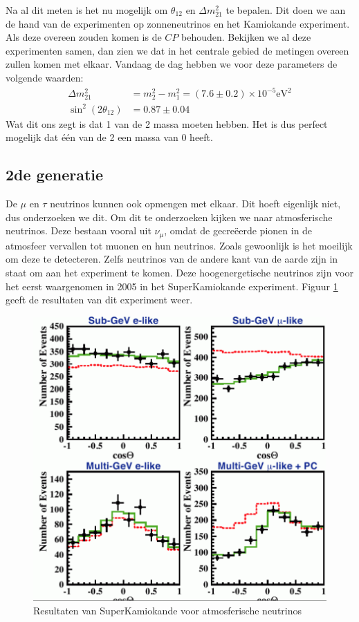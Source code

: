\documentclass[../main.tex]{subfiles}
\begin{document}
Na al dit meten is het nu mogelijk om $\theta_{12}$ en $\Delta m_{21}^{2}$ te bepalen. Dit doen we aan de hand van de experimenten op zonneneutrinos en het Kamiokande experiment. Als deze overeen zouden komen is de $CP$ behouden. Bekijken we al deze experimenten samen, dan zien we dat in het centrale gebied de metingen overeen zullen komen met elkaar. Vandaag de dag hebben we voor deze parameters de volgende waarden:
\begin{equation}
    \begin{aligned}
        \label{eq:neutrino_osc_waarden}
        \Delta m_{21}^{2}&=m_{2}^{2}-m_{1}^{2}=(7.6 \pm 0.2) \times 10^{-5} \mathrm{eV}^{2}\\
        \sin ^{2}\left(2 \theta_{12}\right)&=0.87 \pm 0.04
    \end{aligned}
\end{equation}
Wat dit ons zegt is dat 1 van de 2 massa moeten hebben. Het is dus perfect mogelijk dat één van de 2 een massa van 0 heeft.

\subsection{2de generatie}%
\label{sub:2de_generatie}

De $\mu$ en $\tau$ neutrinos kunnen ook opmengen met elkaar. Dit hoeft eigenlijk niet, dus onderzoeken we dit. Om dit te onderzoeken kijken we naar atmosferische neutrinos. Deze bestaan vooral uit $\nu_\mu$, omdat de gecreëerde pionen in de atmosfeer vervallen tot muonen en hun neutrinos. Zoals gewoonlijk is het moeilijk om deze te detecteren. Zelfs neutrinos van de andere kant van de aarde zijn in staat om aan het experiment te komen. Deze hoogenergetische neutrinos zijn voor het eerst waargenomen in 2005 in het SuperKamiokande experiment. Figuur \ref{fig:neutrinos/superkamiokande_experiment} geeft de resultaten van dit experiment weer.

\begin{figure}[h]
    \centering
    \includegraphics[width=0.5\linewidth]{neutrinos/superkamiokande_experiment.png}
    \caption{Resultaten van SuperKamiokande voor atmosferische neutrinos}%
    \label{fig:neutrinos/superkamiokande_experiment}
\end{figure}
\end{document}
